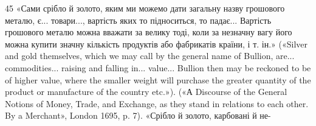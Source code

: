 45 «Сами срібло й золото, яким ми можемо дати загальну назву грошового
металю, є... товари..., вартість яких то підноситься, то падає...
Вартість грошового металю можна вважати за велику тоді, коли за
незначну вагу його можна купити значну кількість продуктів або фабрикатів
 країни, і т. ін.» («Silver and gold themselves, which we may call
by the general name of Bullion, are... commodities... raising and falling
in... value... Bullion then may be reckoned to be of higher value, where
the smaller weight will purchase the greater quantity of the product or
manufacture of the country etc.»). («А Discourse of the General Notions
of Money, Trade, and Exchange, as they stand in relations to each other.
By a Merchant», London 1695, p. 7). «Срібло й золото, карбовані й не-
